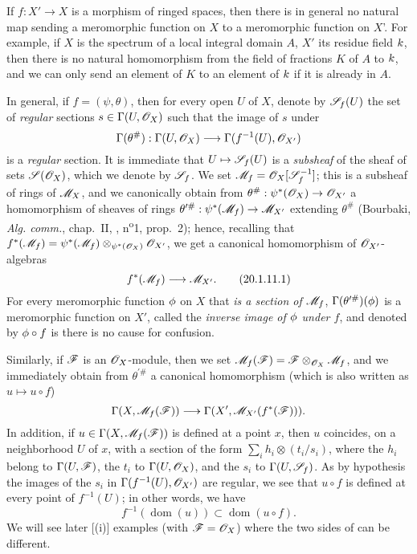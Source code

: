 \begin{env}[20.1.11]
\label{IV.20.1.11}
If $f:X'\to X$ is a morphism of ringed spaces, then there is in general no natural map sending a meromorphic function on $X$ to a meromorphic function on $X$'.
For example, if $X$ is the spectrum of a local integral domain $A$, $X'$ its residue field $k$, then there is no natural homomorphism from the field of fractions $K$ of $A$ to $k$, and we can only send an element of $K$ to an element of $k$ if it is already in $A$.

In general, if $f=(\psi,\theta)$, then for every open $U$ of $X$, denote by $\mathscr{S}_f(U)$ the set of \emph{regular} sections $s\in\Gamma(U,\mathscr{O}_X)$ such that the image of $s$ under
\[
  \Gamma(\theta^\#):\Gamma(U,\sh{O}_X)\to\Gamma(f^{-1}(U),\sh{O}_{X'})
\]
is a \emph{regular} section.
It is immediate that $U\mapsto\sh{S}_f(U)$ is a \emph{subsheaf} of the sheaf of sets $\mathscr{S}(\mathscr{O}_X)$, which we denote by $\mathscr{S}_f$.
We set $\mathscr{M}_f=\mathscr{O}_X[\mathscr{S}_f^{-1}]$;
this is a subsheaf
of rings of $\mathscr{M}_X$, and we canonically obtain from $\theta^\#:\psi^*(\sh{O}_X)\to\sh{O}_{X'}$ a homomorphism of sheaves of rings $\theta^{\prime\#}:\psi^*(\sh{M}_f)\to\sh{M}_{X'}$ extending $\theta^\#$ (Bourbaki, \emph{Alg. comm.}, chap.~II, , n\textsuperscript{o}1, prop.~2);
hence, recalling that $f^*(\mathscr{M}_f)=\psi^*(\mathscr{M}_f)\otimes_{\psi^*(\mathscr{O}_X)}\mathscr{O}_{X'}$,
we get a canonical homomorphism of $\mathscr{O}_{X'}$-algebras
\[
\label{IV.20.1.11.1}
  f^*(\sh{M}_f)\to\sh{M}_{X'}.
  \tag{20.1.11.1}
\]
For every meromorphic function $\phi$ on $X$ that \emph{is a section of $\mathscr{M}_f$}, $\Gamma(\theta^{\prime\#})(\phi)$ is a meromorphic function on $X'$, called the \emph{inverse image of $\phi$ under $f$}, and denoted by $\phi\circ f$ is there is no cause for confusion.

Similarly, if $\mathscr{F}$ is an $\mathscr{O}_X$-module, then we set $\mathscr{M}_f(\mathscr{F})=\mathscr{F}\otimes_{\mathscr{O}_X}\mathscr{M}_f$, and we immediately obtain from $\theta^{\prime\#}$ a canonical homomorphism (which is also written as $u\mapsto u\circ f$)
\[
  \Gamma(X,\sh{M}_f(\sh{F}))\to\Gamma(X',\sh{M}_{X'}(f^*(\sh{F}))).
\]
In addition, if $u\in\Gamma(X,\mathscr{M}_f(\mathscr{F}))$ is defined  at a point $x$, then $u$ coincides, on a neighborhood $U$ of $x$, with a section of the form $\sum_i h_i\otimes(t_i/s_i)$, where the $h_i$ belong to $\Gamma(U,\mathscr{F})$, the $t_i$ to $\Gamma(U,\mathscr{O}_X)$, and the $s_i$ to $\Gamma(U,\mathscr{S}_f)$.
As by hypothesis the images of the $s_i$ in $\Gamma(f^{-1}(U),\mathscr{O}_{X'})$ are regular, we see that $u\circ f$ is defined at every point of $f^{-1}(U)$;
in other words, we have
\[
\label{IV.20.1.11.2}
  f^{-1}(\operatorname{dom}(u))\subset\operatorname{dom}(u\circ f).
  \tag{20.1.11.2}
\]
We will see later [(i)] examples (with $\mathscr{F}=\mathscr{O}_X$) where the two sides of  can be different.


\end{env}
